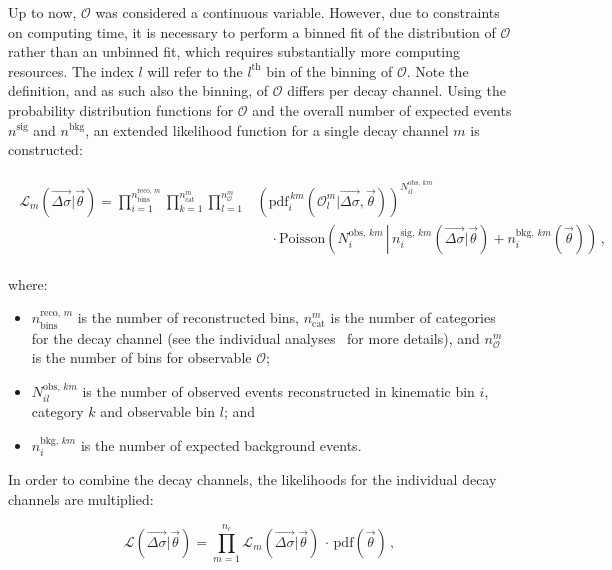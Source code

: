 Up to now, $\mathcal{O}$ was considered a continuous variable.
% 
However, due to constraints on computing time, it is necessary to perform a binned fit of the distribution of $\mathcal{O}$ rather than an unbinned fit, which requires substantially more computing resources.
% 
The index $l$ will refer to the $l^\text{th}$ bin of the binning of $\mathcal{O}$.
% 
Note the definition, and as such also the binning, of $\mathcal{O}$ differs per decay channel.
% 
Using the probability distribution functions for $\mathcal{O}$ and the overall number of expected events $n^\text{sig}$ and $n^\text{bkg}$, an extended likelihood function for a single decay channel $m$ is constructed:
% 
\begin{linenomath*}
\begin{align}
\begin{split}
\mathcal{L}_m(\vec{\Delta\sigma} | \vec{\theta}) =
    \prod_{i=1}^{n_\text{bins}^{\text{reco},\,m}}
    \prod_{k=1}^{n_\text{cat}^m}
    \prod_{l=1}^{n_\mathcal{O}^m}
        &
        \left(
        \text{pdf}_i^{\,km}(\mathcal{O}_l^m | \vec{\Delta\sigma}, \vec{\theta})
        \right)^{ N^{\text{obs},\,km}_{il} }
        \\
        & \quad \cdot
        \text{Poisson}\left(
            N^{\text{obs},\,km}_{i}
            \, \left| \,
            n_i^{\text{sig},\,km}(\vec{\Delta\sigma} | \vec{\theta})
            + n^{\text{bkg},\,km}_i(\vec{\theta})
            \right)\right.
\,,
\label{eq:L_per_decaychannel}
\end{split}
\end{align}
\end{linenomath*}
% 
where:
% 
\begin{itemize}
\item $n_\text{bins}^{\text{reco},\,m}$ is the number of reconstructed bins,
$n_\text{cat}^m$ is the number of categories for the decay channel (see the individual analyses~\cite{Sirunyan:2018kta, CMS_AN_2016-442, CMS_AN_2016-366} for more details),
and $n_\mathcal{O}^m$ is the number of bins for observable $\mathcal{O}$;
% 
\item $N^{\text{obs},\,km}_{il}$ is the number of observed events reconstructed in kinematic bin $i$, category $k$ and observable bin $l$; and
% 
\item $n^{\text{bkg},\,km}_i$ is the number of expected background events.
\end{itemize}
% 
In order to combine the decay channels, the likelihoods for the individual decay channels are multiplied:
% 
\begin{linenomath*}
\begin{equation}
\label{eq:fulllikelihood}
\mathcal{L}(\vec{\Delta\sigma} | \vec{\theta})
= \prod_{m=1}^{n_c} \mathcal{L}_m(\vec{\Delta\sigma} | \vec{\theta})
    \,\cdot\,
    \text{pdf}(\vec{\theta})
\,,
\end{equation}
\end{linenomath*}
